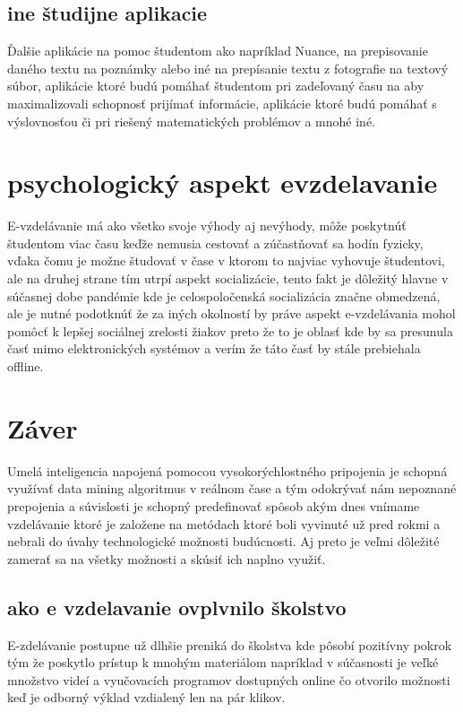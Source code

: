 \documentclass[10pt,oneside,slovak,a4paper]{article}
\begin{document}
\subsection{ine študijne aplikacie}
Ďalšie aplikácie na pomoc študentom ako napríklad Nuance, na prepisovanie daného textu na poznámky alebo iné na prepísanie textu z fotografie na textový súbor, aplikácie ktoré budú pomáhať študentom pri zadeľovaný času na aby maximalizovali schopnosť prijímať informácie, aplikácie ktoré budú pomáhať s výslovnosťou či pri riešený matematických problémov a mnohé iné.


\section{psychologický aspekt evzdelavanie }
E-vzdelávanie má ako všetko svoje výhody aj nevýhody, môže poskytnúť študentom viac času keďže nemusia cestovať a zúčastňovať sa hodín fyzicky, vďaka čomu je možne študovať v čase v ktorom to najviac vyhovuje študentovi, ale na druhej strane tím utrpí aspekt socializácie, tento fakt je dôležitý hlavne v súčasnej dobe pandémie kde je celospoločenská socializácia značne obmedzená, ale je nutné podotknúť že za iných okolností by práve aspekt e-vzdelávania mohol pomôcť k lepšej sociálnej zrelosti žiakov preto že to je oblasť kde by sa presunula časť mimo elektronických systémov a verím že táto časť by stále prebiehala offline.


\section{Záver}
\cite{AI}Umelá inteligencia napojená pomocou vysokorýchlostného pripojenia je schopná využívať data mining algoritmus v reálnom čase a tým odokrývať nám nepoznané prepojenia a súvislosti je schopný predefinovať spôsob akým dnes vnímame vzdelávanie ktoré je založene na metódach ktoré boli vyvinuté už pred rokmi a nebrali do úvahy technologické možnosti budúcnosti. Aj preto je veľmi dôležité zamerať sa na všetky možnosti a skúsiť ich naplno využiť.

\subsection{ako e vzdelavanie ovplvnilo školstvo}
E-zdelávanie postupne už dlhšie preniká do školstva kde pôsobí pozitívny pokrok tým že poskytlo prístup k mnohým materiálom napríklad v súčasnosti je veľké množstvo videí a vyučovacích programov dostupných online čo otvorilo možnosti keď je odborný výklad vzdialený len na pár klikov. \cite{10.1145/3399971.3399984}
\end{document}
